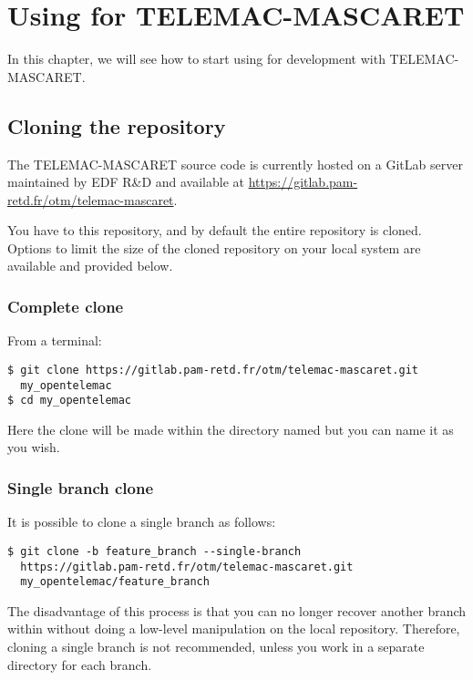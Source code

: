 \chapter{Using  for TELEMAC-MASCARET}

In this chapter, we will see how to start using  for development with
TELEMAC-MASCARET.

\section{Cloning the repository}

The TELEMAC-MASCARET source code is currently hosted on a GitLab server
maintained by EDF R\&D and available at
\url{https://gitlab.pam-retd.fr/otm/telemac-mascaret}. 

You have to  this  repository, and by default the
entire repository is cloned. Options to limit the size of the cloned repository
on your local system are available and provided below.

\subsection{Complete clone}
From a terminal:
\begin{small}
\begin{lstlisting}
$ git clone https://gitlab.pam-retd.fr/otm/telemac-mascaret.git
  my_opentelemac
$ cd my_opentelemac
\end{lstlisting}
\end{small}

Here the clone will be made within the directory named
 but you can name it as you wish.

\subsection{Single branch clone}
It is possible to clone a single branch as follows:
\begin{small}
\begin{lstlisting}
$ git clone -b feature_branch --single-branch
  https://gitlab.pam-retd.fr/otm/telemac-mascaret.git
  my_opentelemac/feature_branch
\end{lstlisting}
\end{small}

The disadvantage of this process is that you can no longer recover another
branch within  without doing a low-level
manipulation on the local repository. Therefore, cloning a single branch is not
recommended, unless you work in a separate directory for each branch.

